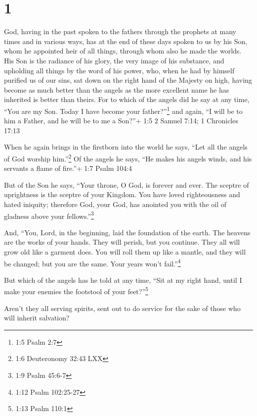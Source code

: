 \hypertarget{section}{%
\section{1}\label{section}}

 God, having in the past spoken to the fathers through the
prophets at many times and in various ways,  has at the end
of these days spoken to us by his Son, whom he appointed heir of all
things, through whom also he made the worlds.  His Son is
the radiance of his glory, the very image of his substance, and
upholding all things by the word of his power, who, when he had by
himself purified us of our sins, sat down on the right hand of the
Majesty on high,  having become as much better than the
angels as the more excellent name he has inherited is better than
theirs.  For to which of the angels did he say at any time,
``You are my Son. Today I have become your father?''\footnote{1:5 Psalm
  2:7} and again, ``I will be to him a Father, and he will be to me a
Son?''+ 1:5 2 Samuel 7:14; 1 Chronicles 17:13

 When he again brings in the firstborn into the world he
says, ``Let all the angels of God worship him.''\footnote{1:6
  Deuteronomy 32:43 LXX}  Of the angels he says, ``He makes
his angels winds, and his servants a flame of fire.''+ 1:7 Psalm 104:4

 But of the Son he says, ``Your throne, O God, is forever
and ever. The sceptre of uprightness is the sceptre of your Kingdom.
 You have loved righteousness and hated iniquity; therefore
God, your God, has anointed you with the oil of gladness above your
fellows.''\footnote{1:9 Psalm 45:6-7}

 And, ``You, Lord, in the beginning, laid the foundation of
the earth. The heavens are the works of your hands.  They
will perish, but you continue. They all will grow old like a garment
does.  You will roll them up like a mantle, and they will
be changed; but you are the same. Your years won't fail.''\footnote{1:12
  Psalm 102:25-27}

 But which of the angels has he told at any time, ``Sit at
my right hand, until I make your enemies the footstool of your
feet?''\footnote{1:13 Psalm 110:1}

 Aren't they all serving spirits, sent out to do service
for the sake of those who will inherit salvation?

